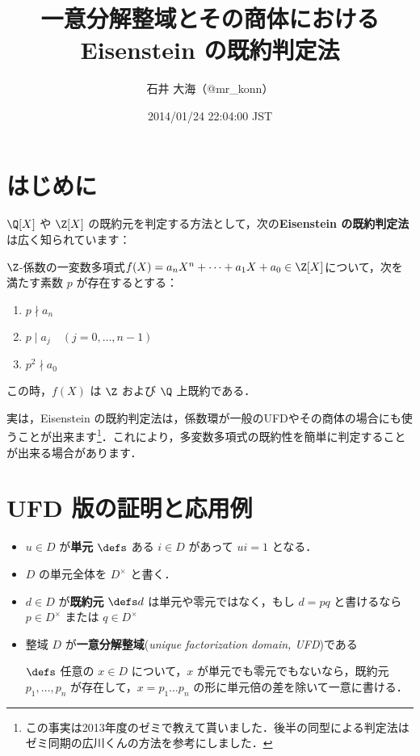 \documentclass[a4j]{ltjsarticle}
\title{一意分解整域とその商体における Eisenstein の既約判定法}
\author{石井 大海（@mr\_konn）}
\date{2014/01/24 22:04:00 JST}
\newcommand{\divs}{\mathrel{\mid}}
\begin{document}
\maketitle

\section{はじめに}
$\Q[X]$ や $\Z[X]$ の既約元を判定する方法として，次の{\bfseries Eisenstein の既約判定法}は広く知られています：

\begin{theorem}
 $\Z$-係数の一変数多項式$f(X) = a_n X^n + \dots + a_1 X + a_0 \in \Z[X]$について，次を満たす素数 $p$ が存在するとする：

 \begin{enumerate}[label=(\arabic*)]
  \item $p \nmid a_n$
  \item $p \divs a_j \quad (j = 0, \dots, n-1)$
  \item $p^2 \nmid a_0$
 \end{enumerate}
 この時，$f(X)$ は $\Z$ および $\Q$ 上既約である．
\end{theorem}

実は，Eisenstein の既約判定法は，係数環が一般のUFDやその商体の場合にも使うことが出来ます\footnote{この事実は2013年度のゼミで教えて貰いました．後半の同型による判定法はゼミ同期の広川くんの方法を参考にしました．}．これにより，多変数多項式の既約性を簡単に判定することが出来る場合があります．

\section{UFD 版の証明と応用例}

\begin{definition}
 \begin{itemize}
  \item $u \in D$ が{\bfseries 単元} $\defs$ ある $i \in D$ があって $ui = 1$ となる．
  \item $D$ の単元全体を $D^\times$ と書く．
  \item $d \in D$ が{\bfseries 既約元} $\defs d $ は単元や零元ではなく，もし $d = pq$ と書けるなら $p \in D^\times$ または $q \in D^\times$
  \item 整域 $D$ が{\bfseries 一意分解整域}({\itshape unique factorization domain, UFD})である

  $\defs$ 任意の $x \in D$ について，$x$ が単元でも零元でもないなら，既約元 $p_1, \dots, p_n$ が存在して，$x = p_1 \dots p_n$ の形に単元倍の差を除いて一意に書ける．
 \end{itemize}
\end{definition}
\end{document}
